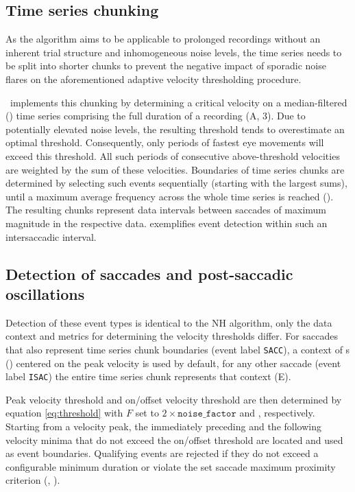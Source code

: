 \subsection*{Time series chunking}

As the algorithm aims to be applicable to prolonged recordings without an
inherent trial structure and inhomogeneous noise levels, the time series needs
to be split into shorter chunks to prevent the negative impact of sporadic
noise flares on the aforementioned adaptive velocity thresholding procedure.

\remodnav\ implements this chunking by determining a critical velocity on a
median-filtered () time series comprising the
full duration of a recording (A, 3). Due to potentially elevated noise
levels, the resulting threshold tends to overestimate an optimal threshold.
Consequently, only periods of fastest eye movements will exceed this threshold.
All such periods of consecutive above-threshold velocities are weighted by the
sum of these velocities. Boundaries of time series chunks are determined by
selecting such events sequentially (starting with the largest sums), until a
maximum average frequency across the whole time series is reached
(). The resulting chunks represent data
intervals between saccades of maximum magnitude in the respective data.
 exemplifies event detection within such an intersaccadic interval.

\subsection*{Detection of saccades and post-saccadic oscillations}

Detection of these event types is identical to the NH algorithm, only the data
context and metrics for determining the velocity thresholds differ.  For
saccades that also represent time series chunk boundaries (event label
\texttt{SACC}), a context of \unit[1]{s}
() centered on the peak velocity is
used by default, for any other saccade (event label \texttt{ISAC}) the entire
time series chunk represents that context (E).

Peak velocity threshold and on/offset velocity threshold are then determined by
equation \ref{eq:threshold} with $F$ set to $2\times\mathtt{noise\_factor}$ and
, respectively. Starting from a velocity peak, the
immediately preceding and the following velocity minima that do not exceed the
on/offset threshold are located and used as event boundaries. Qualifying events
are rejected if they do not exceed a configurable minimum duration or violate
the set saccade maximum proximity criterion (,
).

